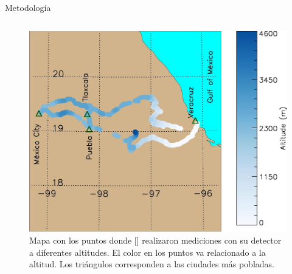\begin{frame}{Metodología}
\begin{columns}
            \begin{column}{0.4\textwidth} %
            \begin{figure}
                \includegraphics[width=1.1\textwidth]{Figures/map1.jpg}
                \caption{\tiny Mapa con los puntos donde [\cite{lara2016}] realizaron mediciones con su detector a diferentes altitudes. El color en los puntos va relacionado a la altitud. Los triángulos corresponden a las ciudades más pobladas.}
            \end{figure}
            \end{column}
        \end{columns}
    \end{frame}


